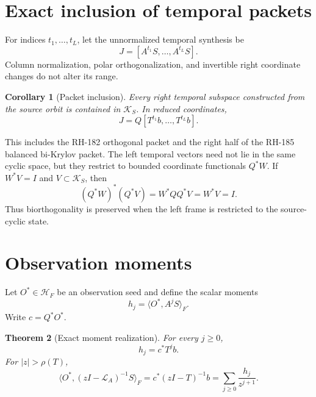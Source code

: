 \documentclass[12pt]{article}
\newtheorem{theorem}{Theorem}[section]
\newtheorem{corollary}[theorem]{Corollary}
\theoremstyle{remark}
\newcommand{\cH}{\mathcal H}
\newcommand{\cK}{\mathcal K}
\newcommand{\cL}{\mathcal L}
\begin{document}
\section{Exact inclusion of temporal packets}

For indices $t_1,\ldots,t_L$, let the unnormalized temporal synthesis be
\begin{equation}\label{eq:synthesis}
 J=[A^{t_1}S,\ldots,A^{t_L}S].
\end{equation}
Column normalization, polar orthogonalization, and invertible right
coordinate changes do not alter its range.

\begin{corollary}[Packet inclusion]\label{cor:packet-inclusion}
Every right temporal subspace constructed from the source orbit is contained
in $\cK_S$.  In reduced coordinates,
\begin{equation}\label{eq:reduced-synthesis}
 J=Q[T^{t_1}b,\ldots,T^{t_L}b].
\end{equation}
\end{corollary}

This includes the RH-182 orthogonal packet and the right half of the RH-185
balanced bi-Krylov packet.  The left temporal vectors need not lie in the
same cyclic space, but they restrict to bounded coordinate functionals
$Q^*W$.  If $W^*V=I$ and $V\subset\cK_S$, then
\begin{equation}\label{eq:left-restriction}
 (Q^*W)^*(Q^*V)=W^*QQ^*V=W^*V=I.
\end{equation}
Thus biorthogonality is preserved when the left frame is restricted to the
source-cyclic state.

\section{Observation moments}

Let $O^*\in\cH_F$ be an observation seed and define the scalar moments
\begin{equation}\label{eq:moments}
 h_j=\langle O^*,A^jS\rangle_F.
\end{equation}
Write $c=Q^*O^*$.

\begin{theorem}[Exact moment realization]\label{thm:moments}
For every $j\ge0$,
\begin{equation}\label{eq:moment-realization}
 h_j=c^*T^jb.
\end{equation}
For $|z|>\rho(T)$,
\begin{equation}\label{eq:transfer}
 \langle O^*,(zI-\cL_A)^{-1}S\rangle_F
 =c^*(zI-T)^{-1}b
 =\sum_{j\ge0}\frac{h_j}{z^{j+1}}.
\end{equation}
\end{theorem}
\end{document}
